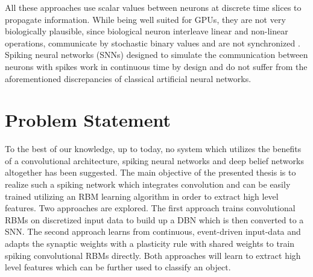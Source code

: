 All these approaches use scalar values between neurons at discrete time slices to propagate information. 
While being well suited for GPUs, they are not very biologically plausible, since biological neuron interleave linear and non-linear operations, communicate by stochastic binary values and are not synchronized \cite{bengio2015towards}. 
Spiking neural networks (SNNs) designed to simulate the communication between neurons with spikes work in continuous time by design and do not suffer from the aforementioned discrepancies of classical artificial neural networks.

\section{Problem Statement} \label{c:probstate}

To the best of our knowledge, up to today, no system which utilizes the benefits of a convolutional architecture, spiking neural networks and deep belief networks altogether has been suggested. 
The main objective of the presented thesis is to realize such a spiking network which integrates convolution and can be easily trained utilizing an RBM learning algorithm in order to extract high level features. 
Two approaches are explored. 
The first approach trains convolutional RBMs on discretized input data to build up a DBN which is then converted to a SNN. 
The second approach learns from continuous, event-driven input-data and adapts the synaptic weights with a plasticity rule with shared weights to train spiking convolutional RBMs directly. 
Both approaches will learn to extract high level features which can be further used to classify an object. 

%
%
%


